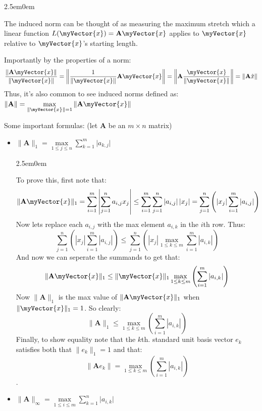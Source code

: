 \documentclass{book}
\newcommand{\hTwo}{%
   \color{MidnightBlue}%
   \fontsize{13}{15}\selectfont%
}
\newcommand{\hFour}{%
   \color{Cerulean}
   \fontsize{12}{14}\selectfont%
}
\newenvironment{myIndent}{%
   \begin{adjustwidth}{2.5em}{0em}%
}{%
   \end{adjustwidth}%
}
\newcommand{\retTwo}{\hfill\bigbreak}
\newcommand{\mVec}[1]{\myVector{#1}}
\newcommand{\mMat}[1]{\mathbf{#1}}
\begin{document}
   {\begin{myIndent} \hTwo
      The induced norm can be thought of as measuring the maximum stretch which a linear function $L(\mVec{x}) = \mMat{A}\mVec{x}$ applies to $\mVec{x}$ relative to $\mVec{x}$'s starting length. \retTwo

      Importantly by the properties of a norm:
      \[\frac{\|\mMat{A}\mVec{x}\|}{\|\mVec{x}\|} = \left\|\frac{1}{\|\mVec{x}\|}\mMat{A}\mVec{x}\right\| = \left\|\mMat{A}\frac{\mVec{x}}{\|\mVec{x}\|}\right\| = \left\|\mMat{A}\hat{x}\right\|\]
      Thus, it's also common to see induced norms defined as: $\|\mMat{A}\| = \max\limits_{\|\mVec{x}\| = 1}{\|\mMat{A}\mVec{x}\|}$
      \retTwo

      Some important formulas: (let $\mMat{A}$ be an $m \times n$ matrix)
      \begin{itemize}
         \item $\|\mMat{A}\|_1 = \max\limits_{1\leq j \leq n}{{\displaystyle \sum_{k=1}^m{\lvert a_{k,j} \rvert}}}$ \retTwo
         
         {\begin{myIndent} \hFour
            To prove this, first note that: \[\|\mMat{A}\mVec{x}\|_1 = \sum_{i=1}^m{\left|\sum_{j=1}^n{a_{i,j}x_j}\right|} \leq \sum_{i=1}^m{\sum_{j=1}^n{\left|a_{i,j}\right|\left|x_j\right|}} = \sum_{j=1}^n{\left(\left|x_j\right|\sum_{i=1}^m{\left|a_{i,j}\right|}\right)}\]
            Now lets replace each $a_{i,j}$ with the max element $a_{i,k}$ in the $i$th row. Thus: \[\sum_{j=1}^n{\left(\left|x_j\right|\sum_{i=1}^m{\left|a_{i,j}\right|}\right)} \leq \sum_{j=1}^n{\left(\left|x_j\right|\max\limits_{1\leq k \leq m}{
            \sum_{i=1}^m{\left|a_{i,k}\right|}}\right)}\]
            And now we can seperate the summands to get that: \[\|\mMat{A}\mVec{x}\|_1 \leq \|\mVec{x}\|_1\max\limits_{1\leq k \leq m}{\left(\sum_{i=1}^m{\left|a_{i,k}\right|}\right)}\]
            Now $\|\mMat{A}\|_1$ is the max value of $\|\mMat{A}\mVec{x}\|_1$ when $\|\mVec{x}\|_1 = 1$. So clearly: \[\|\mMat{A}\|_1 \leq{\displaystyle\max\limits_{1\leq k \leq m}{\left(\sum_{i=1}^m{\left|a_{i,k}\right|}\right)}}\]
            Finally, to show equality note that the $k$th. standard unit basis vector $e_k$ satisfies both that $\|e_k\|_1 = 1$ and that:
            \[\|\mMat{A}e_k\| = \max\limits_{1\leq k \leq m}{\left(\sum_{i=1}^m{\left|a_{i,k}\right|}\right)}\]. \retTwo
         \end{myIndent}}

         \item $\|\mMat{A}\|_\infty = \max\limits_{1\leq i \leq m}{{\displaystyle \sum_{k=1}^n{\lvert a_{i,k} \rvert}}}$ \retTwo
         

\end{itemize}
\end{myIndent}}
\end{document}

